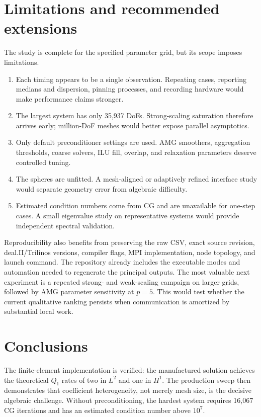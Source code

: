 \documentclass[10pt,a4paper]{article}
\begin{document}
\newpage
\section{Limitations and recommended extensions}
The study is complete for the specified parameter grid, but its scope imposes limitations.
\begin{enumerate}
 \item Each timing appears to be a single observation. Repeating cases, reporting medians and
 dispersion, pinning processes, and recording hardware would make performance claims stronger.
 \item The largest system has only 35,937 DoFs. Strong-scaling saturation therefore arrives early;
 million-DoF meshes would better expose parallel asymptotics.
 \item Only default preconditioner settings are used. AMG smoothers, aggregation thresholds,
 coarse solvers, ILU fill, overlap, and relaxation parameters deserve controlled tuning.
 \item The spheres are unfitted. A mesh-aligned or adaptively refined interface study would separate
 geometry error from algebraic difficulty.
 \item Estimated condition numbers come from CG and are unavailable for one-step cases. A small
 eigenvalue study on representative systems would provide independent spectral validation.
\end{enumerate}

Reproducibility also benefits from preserving the raw CSV, exact source revision, deal.II/Trilinos
versions, compiler flags, MPI implementation, node topology, and launch command. The repository
already includes the executable modes and automation needed to regenerate the principal outputs.
The most valuable next experiment is a repeated strong- and weak-scaling campaign on larger grids,
followed by AMG parameter sensitivity at $p=5$. This would test whether the current qualitative
ranking persists when communication is amortized by substantial local work.

\newpage
\section{Conclusions}
The finite-element implementation is verified: the manufactured solution achieves the theoretical
$Q_1$ rates of two in $L^2$ and one in $H^1$. The production sweep then demonstrates that
coefficient heterogeneity, not merely mesh size, is the decisive algebraic challenge. Without
preconditioning, the hardest system requires 16,067 CG iterations and has an estimated condition
number above $10^7$.
\end{document}
